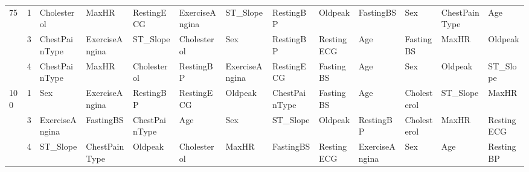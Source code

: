 \begin{table}[htbp]
\begin{tabular}{lllllllllllll}
\multirow[c]{3}{*}{75} & 1 & Cholesterol & MaxHR & RestingECG & ExerciseAngina & ST_Slope & RestingBP & Oldpeak & FastingBS & Sex & ChestPainType & Age \\
 & 3 & ChestPainType & ExerciseAngina & ST_Slope & Cholesterol & Sex & RestingBP & RestingECG & Age & FastingBS & MaxHR & Oldpeak \\
 & 4 & ChestPainType & MaxHR & Cholesterol & RestingBP & ExerciseAngina & RestingECG & FastingBS & Age & Sex & Oldpeak & ST_Slope \\
\multirow[c]{3}{*}{100} & 1 & Sex & ExerciseAngina & RestingBP & RestingECG & Oldpeak & ChestPainType & FastingBS & Age & Cholesterol & ST_Slope & MaxHR \\
 & 3 & ExerciseAngina & FastingBS & ChestPainType & Age & Sex & ST_Slope & Oldpeak & RestingBP & Cholesterol & MaxHR & RestingECG \\
 & 4 & ST_Slope & ChestPainType & Oldpeak & Cholesterol & MaxHR & FastingBS & RestingECG & ExerciseAngina & Sex & Age & RestingBP \\
\bottomrule
\end{tabular}
\end{table}
